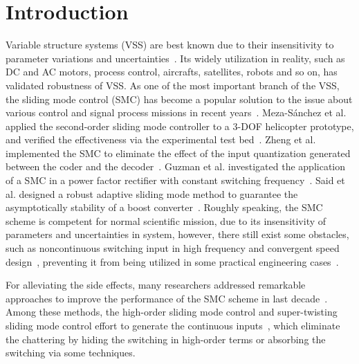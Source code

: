 \documentclass[3p]{elsarticle}
\theoremstyle{plain}
\theoremstyle{remark}
\begin{document}
\section{Introduction}
Variable structure systems (VSS) are best known due to their insensitivity to parameter variations and uncertainties~\cite{slotine1991applied}. Its widely utilization in reality, such as DC and AC motors, process control, aircrafts, satellites, robots and so on, has validated robustness of VSS. As one of the most important branch of the VSS, the sliding mode control (SMC) has become a popular solution to the issue about various control and signal process missions in recent years~\cite{zhao2015nonlinear,zhang2015attitude}. Meza-S{\'a}nchez et al. applied the second-order sliding mode controller to a 3-DOF helicopter prototype, and verified the effectiveness via the experimental test bed~\cite{meza2015output}. Zheng et al. implemented the SMC to eliminate the effect of the input quantization generated between the coder and the decoder~\cite{zheng2016sliding}. Guzman et al. investigated the application of a SMC in a power factor rectifier with constant switching frequency~\cite{guzman2016sliding}. Said et al. designed a robust adaptive sliding mode method to guarantee the asymptotically stability of a boost converter~\cite{oucheriah2013pwm}. Roughly speaking, the SMC scheme is competent for normal scientific mission, due to its insensitivity of parameters and uncertainties in system, however, there still exist some obstacles, such as noncontinuous switching input in high frequency and convergent speed design~\cite{boiko2013chattering,lee2009chattering}, preventing it from being utilized in some practical engineering cases~\cite{fridman2011sliding}. \par
For alleviating the side effects, many researchers addressed remarkable approaches to improve the performance of the SMC scheme in last decade~\cite{zong2013quasi,santiesteban2013time,mu2015continuous,evangelista2013lyapunov,gonzalez2014chattering,dadras2012fractional,zhao2013output}. Among these methods, the high-order sliding mode control and super-twisting sliding mode control effort to generate the continuous inputs~\cite{castillo2015higher,palosz2015laser,edwards2016adaptive,zhao2015finite,liu2015second}, which eliminate the chattering by hiding the switching in high-order terms or absorbing the switching via some techniques. \par
\end{document}
